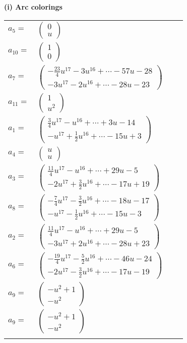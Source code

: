 \documentclass[1p]{elsarticle_modified}
\theoremstyle{definition}
\begin{document}
\flushleft \textbf{(i) Arc colorings}\\
\begin{tabular}{m{7pt} m{180pt} m{7pt} m{180pt} }
\flushright $a_{5}=$&$\begin{pmatrix}0\\u\end{pmatrix}$ \\
\flushright $a_{10}=$&$\begin{pmatrix}1\\0\end{pmatrix}$ \\
\flushright $a_{7}=$&$\begin{pmatrix}-\frac{23}{4} u^{17}-3 u^{16}+\cdots-57 u-28\\-3 u^{17}-2 u^{16}+\cdots-28 u-23\end{pmatrix}$ \\
\flushright $a_{11}=$&$\begin{pmatrix}1\\u^2\end{pmatrix}$ \\
\flushright $a_{1}=$&$\begin{pmatrix}\frac{3}{4} u^{17}- u^{16}+\cdots+3 u-14\\- u^{17}+\frac{1}{2} u^{16}+\cdots-15 u+3\end{pmatrix}$ \\
\flushright $a_{4}=$&$\begin{pmatrix}u\\u\end{pmatrix}$ \\
\flushright $a_{3}=$&$\begin{pmatrix}\frac{11}{4} u^{17}- u^{16}+\cdots+29 u-5\\-2 u^{17}+\frac{3}{2} u^{16}+\cdots-17 u+19\end{pmatrix}$ \\
\flushright $a_{8}=$&$\begin{pmatrix}-\frac{7}{4} u^{17}-\frac{3}{2} u^{16}+\cdots-18 u-17\\- u^{17}-\frac{1}{2} u^{16}+\cdots-15 u-3\end{pmatrix}$ \\
\flushright $a_{2}=$&$\begin{pmatrix}\frac{11}{4} u^{17}- u^{16}+\cdots+29 u-5\\-3 u^{17}+2 u^{16}+\cdots-28 u+23\end{pmatrix}$ \\
\flushright $a_{6}=$&$\begin{pmatrix}-\frac{19}{4} u^{17}-\frac{5}{2} u^{16}+\cdots-46 u-24\\-2 u^{17}-\frac{3}{2} u^{16}+\cdots-17 u-19\end{pmatrix}$ \\
\flushright $a_{9}=$&$\begin{pmatrix}- u^2+1\\- u^2\end{pmatrix}$\\ \flushright $a_{9}=$&$\begin{pmatrix}- u^2+1\\- u^2\end{pmatrix}$\\&\end{tabular}
\end{document}
